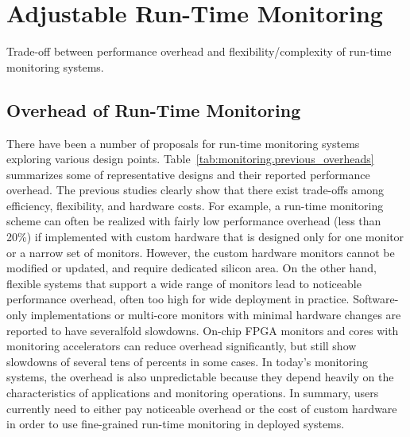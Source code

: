 \section{Adjustable Run-Time Monitoring}
\label{sec:monitoring}

\begin{table*}[t]
  \begin{center}
    \vspace{-0.0in}
    \begin{footnotesize}
    
    \end{footnotesize}
    \caption{Trade-off between performance overhead and flexibility/complexity of run-time monitoring systems.}
    \vspace{-0.2in}
    \label{tab:monitoring.previous_overheads}
  \end{center}
\end{table*}

\subsection{Overhead of Run-Time Monitoring}

There have been a number of proposals for run-time monitoring systems exploring various
design points. %
Table~\ref{tab:monitoring.previous_overheads} summarizes some of representative designs
and their reported performance overhead. The previous studies clearly show that there
exist trade-offs among efficiency, flexibility, and hardware costs. 
For example, a run-time monitoring scheme can often be realized with fairly low
performance overhead (less than 20\%) if implemented with custom hardware that is
designed only for one monitor or a narrow set of monitors. However, the custom
hardware monitors cannot be modified or updated, and require dedicated silicon area. 
On the other hand, flexible systems that support a wide range of monitors lead 
to noticeable performance overhead, often too high for wide deployment in practice.
Software-only implementations \cite{nagarajan-interact08, lift-micro06,
purify-usenix92, taintcheck-ndsss05} or multi-core monitors with minimal
hardware changes \cite{lba-asid06} are reported to have severalfold slowdowns.
On-chip FPGA monitors \cite{flexcore-micro10} and cores with monitoring accelerators
\cite{lba-isca08, fade-hpca14} can reduce overhead significantly, but still show
slowdowns of several tens of percents in some cases.
In today's monitoring systems, the overhead is also unpredictable because they
depend heavily on the characteristics of applications and monitoring operations.
In summary, users currently need to either pay noticeable overhead or the cost of custom
hardware in order to use fine-grained run-time monitoring in deployed systems.

